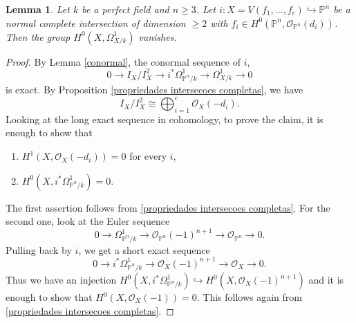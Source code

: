 \documentclass[a4paper,12pt]{amsart}
\newtheorem{lemma}[definition]{Lemma}
\numberwithin{equation}{section}
\renewcommand{\geq}{\geqslant}
\renewcommand{\_}{\rule{0.25cm}{0.4pt}}
\begin{document}
\begin{lemma}\label{Intersecao completa é simplesmente conexa}
    Let $k$ be a perfect field and $n\geq 3$. Let $i\colon X=V(f_{1},\dots,f_{c})\hookrightarrow \mathbb{P}^{n}$ be a normal complete intersection of dimension $\geq 2$ with $f_{i}\in H^{0}(\mathbb{P}^{n},\mathcal{O}_{\mathbb{P}^{n}}(d_{i}))$. Then the group $H^{0}(X,\Omega^{1}_{X/k})$ vanishes.
\end{lemma}
\begin{proof}
    By Lemma \ref{conormal}, the conormal sequence of $i$,
    \[
    0\to I_{X}/I_{X}^{2}\to i^{\ast}\Omega^{1}_{\mathbb{P}^{n}/k}\to \Omega^{1}_{X/k}\to 0
    \]
    is exact. By Proposition \ref{propriedades intersecoes completas}, we have
    \[
    I_{X}/I_{X}^{2}\cong \bigoplus_{i=1}^{c}\mathcal{O}_{X}(-d_{i}).
    \]
    Looking at the long exact sequence in cohomology, to prove the claim, it is enough to show that
    \begin{enumerate}
        \item $H^{1}(X,\mathcal{O}_{X}(-d_{i}))=0$ for every $i$,
        \item $H^{0}(X,i^{\ast}\Omega^{1}_{\mathbb{P}^{n}/k})=0$.
    \end{enumerate}
    The first assertion follows from \ref{propriedades intersecoes completas}. For the second one, look at the Euler sequence
    \[
    0\to \Omega^{1}_{\mathbb{P}^{n}/k}\to \mathcal{O}_{\mathbb{P}^{n}}(-1)^{n+1}\to \mathcal{O}_{\mathbb{P}^{n}}\to 0.
    \]
    Pulling back by $i$, we get a short exact sequence
    \[
    0\to i^{\ast}\Omega^{1}_{\mathbb{P}^{n}/k}\to \mathcal{O}_{X}(-1)^{n+1}\to \mathcal{O}_{X}\to 0.
    \]
    Thus we have an injection $H^{0}(X,i^{\ast}\Omega^{1}_{\mathbb{P}^{n}/k})\hookrightarrow H^{0}(X,\mathcal{O}_{X}(-1)^{n+1})$ and it is enough to show that $H^{0}(X,\mathcal{O}_{X}(-1))=0$. This follows again from \ref{propriedades intersecoes completas}.
\end{proof}
\end{document}
